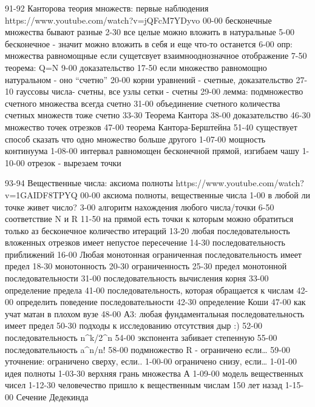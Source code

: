 91-92
Канторова теория множеств: первые наблюдения
https://www.youtube.com/watch?v=jQFcM7YDyvo
00-00 бесконечные множества бывают разные
2-30 все целые можно вложить в натуральные
5-00 бесконечное - значит можно вложить в себя и еще что-то останется
6-00 опр: множества равномощные если сущетсвует взаимнооднозначное отображение
7-50 теорема: Q=N
9-00 доказательство
17-50 если множество равномощно натуральном - оно “счетно”
20-00 корни уравнений - счетные, доказательство
27-10 гауссовы числа- счетны, все узлы сетки - счетны
29-00 лемма: подмножество счетного множества всегда счетно
31-00 объединение счетного количества счетных множеств тоже счетно
33-30 Теорема Кантора
38-00 доказательство
46-30 множество точек отрезков
47-00 теорема Кантора-Берштейна
51-40 существует способ сказать что одно множество больше другого
1-07-00 мощность континуума
1-08-00 интервал равномощен бесконечной прямой, изгибаем чашу
1-10-00 отрезок - вырезаем точки

93-94
Вещественные числа: аксиома полноты
https://www.youtube.com/watch?v=1GAIDF8TPYQ
00-00 аксиома полноты, вещественные числа
1-00 в любой ли точке живет число?
3-00 алгоритм нахождения любого числа/точки
6-50 соответствие N и R
11-50 на прямой есть точки к которым можно обратиться только аз бесконечное количество итераций
13-20 любая последовательность вложенных отрезков имеет непустое пересечение
14-30 последовательность приближений
16-00 Любая монотонная ограниченная последовательность имеет предел
18-30 монотонность
20-30 ограниченность
25-30 предел монотонной последовательности
31-00 последовательность вычисления корня
33-00 определение предела
41-00 последовательность, которая обращается к числам
42-00 определить поведение последовательности
42-30 определение Коши
47-00 как учат матан в плохом вузе
48-00 А3: любая фундаментальная последовательность имеет предел
50-30 подходы к исследованию отсутствия дыр :)
52-00 последовательность n^k/2^n
54-00 экспонента забивает степенную
55-00 последовательность a^n/n!
58-00 подмножество R - ограничено если…
59-00 уточнение: ограничено сверху, если..
1-00-00 ограничено снизу, если…
1-01-00 идея полноты
1-03-30 верхняя грань множества А
1-09-00 модель вещественных чисел
1-12-30 человечество пришло к вещественным числам 150 лет назад
1-15-00 Сечение Дедекинда

